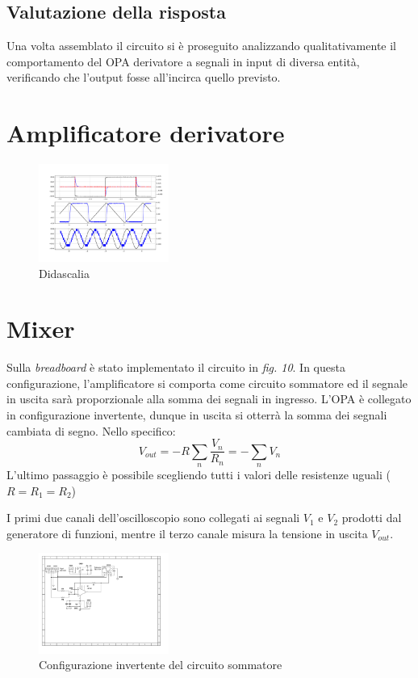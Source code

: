 \documentclass[journal]{IEEEtran}
\begin{document}
\subsection{\textbf{Valutazione della risposta}}
Una volta assemblato il circuito si è proseguito analizzando qualitativamente il comportamento del OPA derivatore a segnali in input di diversa entità, verificando che l'output fosse all'incirca quello previsto.
\section{Amplificatore derivatore} %
\begin{figure}[H]%
\begin {center}
\includegraphics[width=0.38\textwidth]{analysis/output/OPA-differentiator.pdf}
\caption{Didascalia}
\label{fig:OPA}
\end {center}
\end{figure}

\section{Mixer} %
Sulla \textit{breadboard} è stato implementato il circuito in \textit{fig. 10}. In questa configurazione, l'amplificatore si comporta come circuito sommatore ed il segnale in uscita sarà proporzionale alla somma dei segnali in ingresso. L'OPA è collegato in configurazione invertente, dunque in uscita si otterrà la somma dei segnali cambiata di segno. Nello specifico: 
\[V_{out} = - R  \sum_{n} \frac{V_n}{R_n} = - \sum_{n} V_n\] L'ultimo passaggio è possibile scegliendo tutti i valori delle resistenze uguali ($R = R_1 = R_2$)  

I primi due canali dell'oscilloscopio sono collegati ai segnali $V_1$ e $V_2$ prodotti dal generatore di funzioni, mentre il terzo canale misura la tensione in uscita $V_{out}$.

\begin{figure}[H]%
\begin {center}
\includegraphics[width=0.38\textwidth]{sch-simulations/output/OPA-mixer.pdf}
\caption{Configurazione invertente del circuito sommatore}
\label{fig:oscilloscope}
\end {center}
\end{figure}
\end{document}
